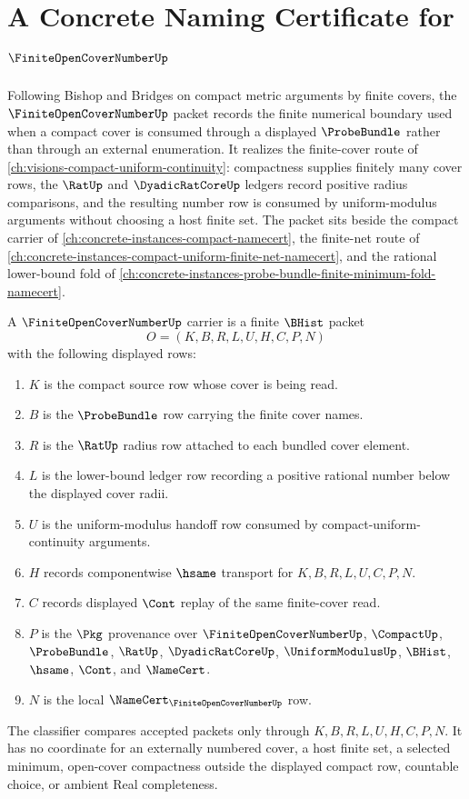 \chapter{A Concrete Naming Certificate for $\FiniteOpenCoverNumberUp$}
\label{ch:concrete-instances-finite-open-cover-number-namecert}

Following Bishop and Bridges on compact metric arguments by finite covers, the $\FiniteOpenCoverNumberUp$ packet records the finite numerical boundary used when a compact cover is consumed through a displayed $\ProbeBundle$ rather than through an external enumeration. It realizes the finite-cover route of \autoref{ch:visions-compact-uniform-continuity}: compactness supplies finitely many cover rows, the $\RatUp$ and $\DyadicRatCoreUp$ ledgers record positive radius comparisons, and the resulting number row is consumed by uniform-modulus arguments without choosing a host finite set. The packet sits beside the compact carrier of \autoref{ch:concrete-instances-compact-namecert}, the finite-net route of \autoref{ch:concrete-instances-compact-uniform-finite-net-namecert}, and the rational lower-bound fold of \autoref{ch:concrete-instances-probe-bundle-finite-minimum-fold-namecert}.

\begin{definition}
\label{def:finite-open-cover-number-carrier}
A $\FiniteOpenCoverNumberUp$ carrier is a finite $\BHist$ packet
$$
O=(K,B,R,L,U,H,C,P,N)
$$
with the following displayed rows:
\begin{enumerate}
\item $K$ is the compact source row whose cover is being read.
\item $B$ is the $\ProbeBundle$ row carrying the finite cover names.
\item $R$ is the $\RatUp$ radius row attached to each bundled cover element.
\item $L$ is the lower-bound ledger row recording a positive rational number below the displayed cover radii.
\item $U$ is the uniform-modulus handoff row consumed by compact-uniform-continuity arguments.
\item $H$ records componentwise $\hsame$ transport for $K,B,R,L,U,C,P,N$.
\item $C$ records displayed $\Cont$ replay of the same finite-cover read.
\item $P$ is the $\Pkg$ provenance over $\FiniteOpenCoverNumberUp$, $\CompactUp$, $\ProbeBundle$, $\RatUp$, $\DyadicRatCoreUp$, $\UniformModulusUp$, $\BHist$, $\hsame$, $\Cont$, and $\NameCert$.
\item $N$ is the local $\NameCert_{\FiniteOpenCoverNumberUp}$ row.
\end{enumerate}
The classifier compares accepted packets only through $K,B,R,L,U,H,C,P,N$. It has no coordinate for an externally numbered cover, a host finite set, a selected minimum, open-cover compactness outside the displayed compact row, countable choice, or ambient Real completeness.
\end{definition}

